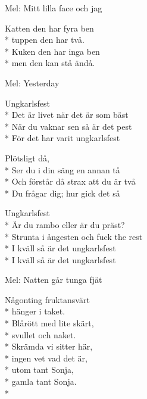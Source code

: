 \begin{SongText}[Benvisa]
    \begin{SongInfo}
        Mel: Mitt lilla face och jag
    \end{SongInfo}
    \begin{SongVerse}
        Katten den har fyra ben\\*%
        tuppen den har två.\\*%
        Kuken den har inga ben\\*%
        men den kan stå ändå.
    \end{SongVerse}
\end{SongText}
\begin{SongText}[Ungkarlsfest]
    \begin{SongInfo}
        Mel: Yesterday
    \end{SongInfo}
    \begin{SongVerse}
        Ungkarlsfest\\*%
        Det är livet när det är som bäst\\*%
        När du vaknar sen så är det pest\\*%
        För det har varit ungkarlsfest
    \end{SongVerse}
    \begin{SongVerse}
        Plötsligt då,\\*%
        Ser du i din säng en annan tå\\*%
        Och förstår då strax att du är två\\*%
        Du frågar dig; hur gick det så
    \end{SongVerse}
    \begin{SongVerse}
        Ungkarlsfest\\*%
        Är du rambo eller är du präst?\\*%
        Strunta i ångesten och fuck the rest\\*%
        I kväll så är det ungkarlsfest\\*%
        I kväll så är det ungkarlsfest
    \end{SongVerse}
\end{SongText}
\begin{SongText}
    \begin{SongInfo}
        Mel: Natten går tunga fjät
    \end{SongInfo}
    \begin{SongVerse}
        Någonting fruktansvärt\\*%
        hänger i taket.\\*%
        Blårött med lite skärt,\\*%
        svullet och naket.\\*%
        Skrämda vi sitter här,\\*%
        ingen vet vad det är,\\*%
        utom tant Sonja,\\*%
        gamla tant Sonja. \\*%
    \end{SongVerse}
\end{SongText}

